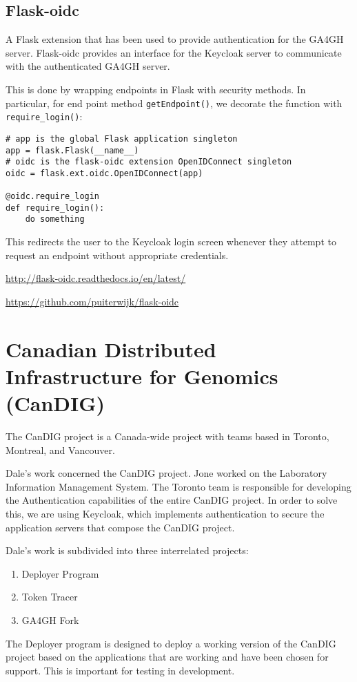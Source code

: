 \documentclass{article}
\begin{document}
\subsection{Flask-oidc}

A Flask extension that has been used to provide authentication
for the GA4GH server. Flask-oidc provides an interface
for the Keycloak server to communicate with the authenticated
GA4GH server.

This is done by wrapping endpoints in Flask with security methods.
In particular, for end point method \texttt{getEndpoint()}, we decorate
the function with \texttt{require\_login()}:

\begin{verbatim}
# app is the global Flask application singleton
app = flask.Flask(__name__)
# oidc is the flask-oidc extension OpenIDConnect singleton
oidc = flask.ext.oidc.OpenIDConnect(app)

@oidc.require_login
def require_login():
    do something
\end{verbatim}

This redirects the user to the Keycloak login screen whenever they
attempt to request an endpoint without appropriate credentials.

\url{http://flask-oidc.readthedocs.io/en/latest/}

\url{https://github.com/puiterwijk/flask-oidc}

\newpage

\section{Canadian Distributed Infrastructure for Genomics (CanDIG)}

The CanDIG project is a Canada-wide project with teams based in Toronto, Montreal, and Vancouver.


Dale's work concerned the CanDIG project. Jone worked on the Laboratory Information Management System.
The Toronto team is responsible for developing the Authentication capabilities of the entire CanDIG project.
In order to solve this, we are using Keycloak, which implements authentication to secure the application
servers that compose the CanDIG project.

Dale's work is subdivided into three interrelated projects:
\begin{enumerate}
\item Deployer Program
\item Token Tracer
\item GA4GH Fork
\end{enumerate}
The Deployer program is designed to deploy a working version of the CanDIG project based on the applications that are working and have been chosen for support. This is important for testing in development.
\end{document}
